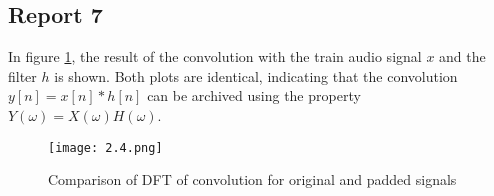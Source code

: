 \subsection*{Report 7}
In figure \ref{figure:2_4}, the result of the convolution with the train audio signal $x$ and the filter $h$ is shown. Both plots are identical, indicating that the convolution $ y[n] = x[n] \ast h[n] $ can be archived using the property $ Y(\omega) = X(\omega) H(\omega) $.

	\begin{figure}[H] 
		\centering
		\texttt{[image: 2.4.png]}
		\caption{Comparison of DFT of convolution for original and padded signals}
		\label{figure:2_4}
	\end{figure}
	